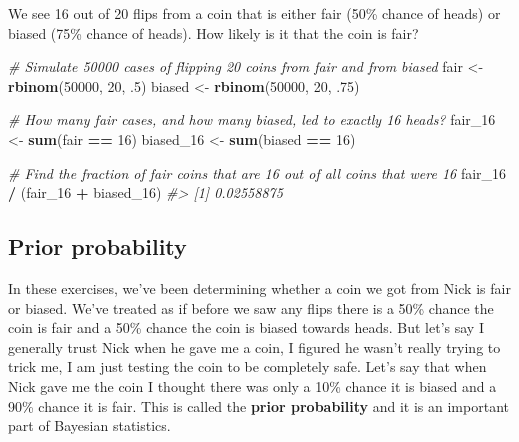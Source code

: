 \documentclass[]{article}
\newenvironment{Shaded}{\begin{snugshade}}{\end{snugshade}}
\newcommand{\CommentTok}[1]{\textcolor[rgb]{0.56,0.35,0.01}{\textit{#1}}}
\newcommand{\DecValTok}[1]{\textcolor[rgb]{0.00,0.00,0.81}{#1}}
\newcommand{\FloatTok}[1]{\textcolor[rgb]{0.00,0.00,0.81}{#1}}
\newcommand{\KeywordTok}[1]{\textcolor[rgb]{0.13,0.29,0.53}{\textbf{#1}}}
\newcommand{\NormalTok}[1]{#1}
\newcommand{\OperatorTok}[1]{\textcolor[rgb]{0.81,0.36,0.00}{\textbf{#1}}}
\newcommand{\StringTok}[1]{\textcolor[rgb]{0.31,0.60,0.02}{#1}}
\begin{document}
We see 16 out of 20 flips from a coin that is either fair (50\% chance
of heads) or biased (75\% chance of heads). How likely is it that the
coin is fair?

\begin{Shaded}
\begin{Highlighting}[]
\CommentTok{# Simulate 50000 cases of flipping 20 coins from fair and from biased}
\NormalTok{fair <-}\StringTok{ }\KeywordTok{rbinom}\NormalTok{(}\DecValTok{50000}\NormalTok{, }\DecValTok{20}\NormalTok{, }\FloatTok{.5}\NormalTok{)}
\NormalTok{biased <-}\StringTok{ }\KeywordTok{rbinom}\NormalTok{(}\DecValTok{50000}\NormalTok{, }\DecValTok{20}\NormalTok{, }\FloatTok{.75}\NormalTok{)}

\CommentTok{# How many fair cases, and how many biased, led to exactly 16 heads?}
\NormalTok{fair_}\DecValTok{16}\NormalTok{ <-}\StringTok{ }\KeywordTok{sum}\NormalTok{(fair }\OperatorTok{==}\StringTok{ }\DecValTok{16}\NormalTok{)}
\NormalTok{biased_}\DecValTok{16}\NormalTok{ <-}\StringTok{ }\KeywordTok{sum}\NormalTok{(biased }\OperatorTok{==}\StringTok{ }\DecValTok{16}\NormalTok{)}

\CommentTok{# Find the fraction of fair coins that are 16 out of all coins that were 16}
\NormalTok{fair_}\DecValTok{16} \OperatorTok{/}\StringTok{ }\NormalTok{(fair_}\DecValTok{16} \OperatorTok{+}\StringTok{ }\NormalTok{biased_}\DecValTok{16}\NormalTok{)}
\CommentTok{#> [1] 0.02558875}
\end{Highlighting}
\end{Shaded}

\hypertarget{prior-probability}{%
\subsection{Prior probability}\label{prior-probability}}

In these exercises, we've been determining whether a coin we got from
Nick is fair or biased. We've treated as if before we saw any flips
there is a 50\% chance the coin is fair and a 50\% chance the coin is
biased towards heads. But let's say I generally trust Nick when he gave
me a coin, I figured he wasn't really trying to trick me, I am just
testing the coin to be completely safe. Let's say that when Nick gave me
the coin I thought there was only a 10\% chance it is biased and a 90\%
chance it is fair. This is called the \textbf{prior probability} and it
is an important part of Bayesian statistics.
\end{document}
